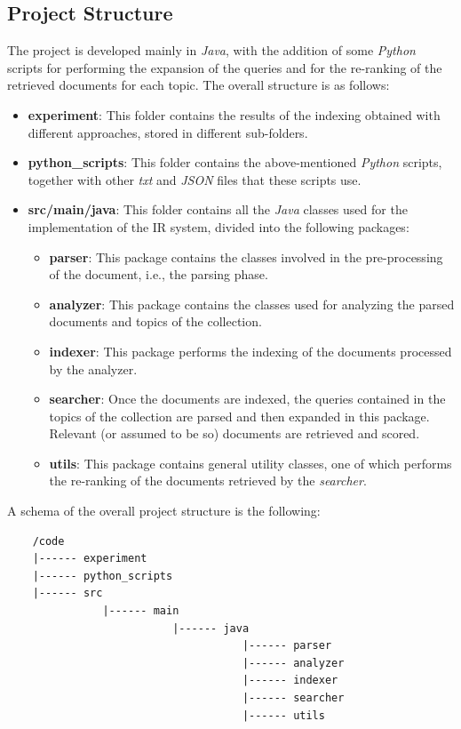 \subsection{Project Structure}
The project is developed mainly in \textit{Java}, with the addition of some \textit{Python} scripts for performing the expansion of the queries and for the re-ranking of the retrieved documents for each topic. The overall structure is as follows:
\begin{itemize}
    \item \textbf{experiment}: This folder contains the results of the indexing obtained with different approaches, stored in different sub-folders.

    \item \textbf{python\_scripts}: This folder contains the above-mentioned \textit{Python} scripts, together with other \textit{txt} and \textit{JSON} files that these scripts use.

    \item \textbf{src/main/java}: This folder contains all the \textit{Java} classes used for the implementation of the \ac{IR} system, divided into the following packages:
    \begin{itemize}
        \item \textbf{parser}: This package contains the classes involved in the pre-processing of the document, i.e., the parsing phase.

        \item \textbf{analyzer}: This package contains the classes used for analyzing the parsed documents and topics of the collection.

        \item \textbf{indexer}: This package performs the indexing of the documents processed by the analyzer.

        \item \textbf{searcher}: Once the documents are indexed, the queries contained in the topics of the collection are parsed and then expanded in this package. Relevant (or assumed to be so) documents are retrieved and scored.

        \item \textbf{utils}: This package contains general utility classes, one of which performs the re-ranking of the documents retrieved by the \textit{searcher}.
    \end{itemize}
\end{itemize}

\newpage
A schema of the overall project structure is the following:
\begin{lstlisting}
    /code
    |------ experiment
    |------ python_scripts
    |------ src
               |------ main
                          |------ java
                                     |------ parser
                                     |------ analyzer
                                     |------ indexer
                                     |------ searcher
                                     |------ utils
\end{lstlisting}


